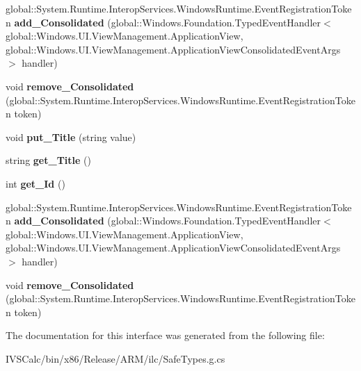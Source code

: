 \begin{DoxyCompactItemize}
global\+::\+System.\+Runtime.\+Interop\+Services.\+Windows\+Runtime.\+Event\+Registration\+Token {\bfseries add\+\_\+\+Consolidated} (global\+::\+Windows.\+Foundation.\+Typed\+Event\+Handler$<$ global\+::\+Windows.\+U\+I.\+View\+Management.\+Application\+View, global\+::\+Windows.\+U\+I.\+View\+Management.\+Application\+View\+Consolidated\+Event\+Args $>$ handler)
\item 
\mbox{\label{interface_windows_1_1_u_i_1_1_view_management_1_1_i_application_view_af6ab836962164e5617ab1386c2e02849}} 
void {\bfseries remove\+\_\+\+Consolidated} (global\+::\+System.\+Runtime.\+Interop\+Services.\+Windows\+Runtime.\+Event\+Registration\+Token token)
\item 
\mbox{\label{interface_windows_1_1_u_i_1_1_view_management_1_1_i_application_view_a92d3277e8c30de745cb16c868d726dd6}} 
void {\bfseries put\+\_\+\+Title} (string value)
\item 
\mbox{\label{interface_windows_1_1_u_i_1_1_view_management_1_1_i_application_view_a8cf31a988ee9afab65de9ee57bad61ac}} 
string {\bfseries get\+\_\+\+Title} ()
\item 
\mbox{\label{interface_windows_1_1_u_i_1_1_view_management_1_1_i_application_view_a085241cde891f43041555e966151192b}} 
int {\bfseries get\+\_\+\+Id} ()
\item 
\mbox{\label{interface_windows_1_1_u_i_1_1_view_management_1_1_i_application_view_ab9e4087fb6ff5d554c2307d00530d07b}} 
global\+::\+System.\+Runtime.\+Interop\+Services.\+Windows\+Runtime.\+Event\+Registration\+Token {\bfseries add\+\_\+\+Consolidated} (global\+::\+Windows.\+Foundation.\+Typed\+Event\+Handler$<$ global\+::\+Windows.\+U\+I.\+View\+Management.\+Application\+View, global\+::\+Windows.\+U\+I.\+View\+Management.\+Application\+View\+Consolidated\+Event\+Args $>$ handler)
\item 
\mbox{\label{interface_windows_1_1_u_i_1_1_view_management_1_1_i_application_view_af6ab836962164e5617ab1386c2e02849}} 
void {\bfseries remove\+\_\+\+Consolidated} (global\+::\+System.\+Runtime.\+Interop\+Services.\+Windows\+Runtime.\+Event\+Registration\+Token token)
\end{DoxyCompactItemize}


The documentation for this interface was generated from the following file\+:\begin{DoxyCompactItemize}
\item 
I\+V\+S\+Calc/bin/x86/\+Release/\+A\+R\+M/ilc/Safe\+Types.\+g.\+cs\end{DoxyCompactItemize}
